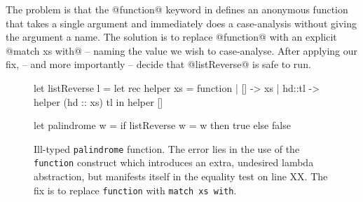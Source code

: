The problem is that the @function@ keyword in \ocaml defines an
anonymous function that takes a single argument and immediately does a
case-analysis without giving the argument a name.
%
The solution is to replace @function@ with an explicit @match xs with@
-- naming the value we wish to case-analyse.
%
After applying our fix, \nanomaly -- and more importantly \ocaml --
decide that @listReverse@ is safe to run.
%
\begin{figure}[t]
\centering
\begin{code}
  let listReverse l =
    let rec helper xs = function
      | [] -> xs
      | hd::tl -> helper (hd :: xs) tl
    in helper []

  let palindrome w =
    if listReverse w = w
    then true
    else false
\end{code}
\caption{Ill-typed \texttt{palindrome} function. The error lies in the
  use of the \texttt{function} construct which introduces an extra,
  undesired lambda abstraction, but manifests itself in the equality
  test on line XX. The fix is to replace \texttt{function} with
  \texttt{match xs with}. }
\label{fig:palindrome}
\end{figure}
%
